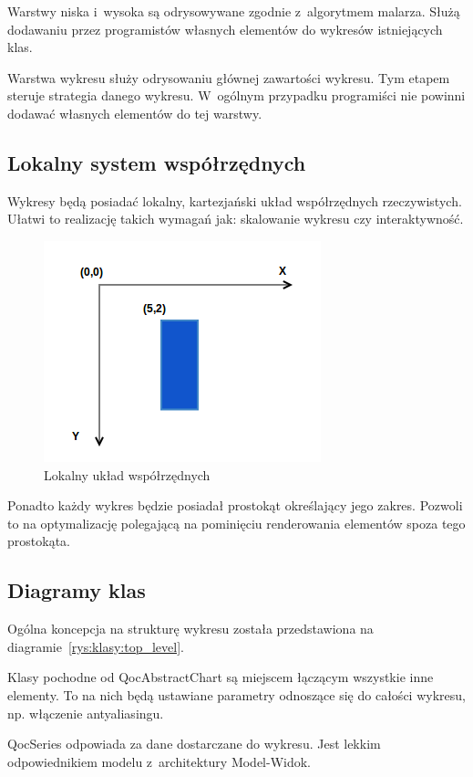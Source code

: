 \documentclass[11pt,twoside,a4paper,final]{llncs}
\begin{document}
Warstwy niska i~wysoka są odrysowywane zgodnie z~algorytmem malarza. Służą dodawaniu przez programistów własnych elementów do wykresów istniejących klas.

Warstwa wykresu służy odrysowaniu głównej zawartości wykresu. Tym etapem steruje strategia danego wykresu. W~ogólnym przypadku programiści nie powinni dodawać własnych elementów do tej warstwy.

\subsection{Lokalny system współrzędnych}
Wykresy będą posiadać lokalny, kartezjański układ współrzędnych rzeczywistych. Ułatwi to realizację takich wymagań jak: skalowanie wykresu czy interaktywność. 

\begin{figure}
\centering
\caption{Lokalny układ współrzędnych}\label{rys:uklad:wspolrzednych}
\includegraphics[scale=0.6]{uklad_wspolrzednych.png}
\end{figure}

Ponadto każdy wykres będzie posiadał prostokąt określający jego zakres. Pozwoli to na optymalizację polegającą na pominięciu renderowania elementów spoza tego prostokąta.

\subsection{Diagramy klas}
Ogólna koncepcja na strukturę wykresu została przedstawiona na diagramie~\ref{rys:klasy:top_level}.

Klasy pochodne od QocAbstractChart są miejscem łączącym wszystkie inne elementy. To na nich będą ustawiane parametry odnoszące się do całości wykresu, np. włączenie antyaliasingu.

QocSeries odpowiada za dane dostarczane do wykresu. Jest lekkim odpowiednikiem modelu z~architektury Model-Widok.
\end{document}
